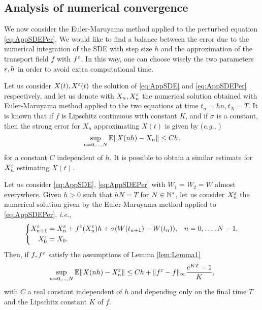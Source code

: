 \subsection{Analysis of numerical convergence}

We now consider the Euler-Maruyama method applied to the perturbed equation \eqref{eq:AppSDEPer}. We would like to find a balance between the error due to the numerical integration of the SDE with step size $h$ and the approximation of the transport field $f$ with $f^\varepsilon$. In this way, one can choose wisely the two parameters $\varepsilon, h$ in order to avoid extra computational time.

\noindent Let us consider $X(t), X^\varepsilon(t)$ the solution of \eqref{eq:AppSDE} and \eqref{eq:AppSDEPer} respectively, and let us denote with $X_n, X_n^\varepsilon$ the numerical solution obtained with Euler-Maruyama method applied to the two equations at time $t_n = hn, t_N = T$. It is known that if $f$ is Lipschitz continuous with constant $K$, and if $\sigma$ is a constant, then the strong error for $X_n$ approximating $X(t)$ is given by (\textit{e.g.}, \cite[Chapter 10]{Kloeden1992})
\begin{equation}\label{eq:StrongEM}
	\sup_{n = 0, \dots, N} \mathbb{E} \|X(nh) - X_n\| \leq C h,
\end{equation}
for a constant $C$ independent of $h$. It is possible to obtain a similar estimate for $X_n^\varepsilon$ estimating $X(t)$. 
\begin{theorem}\label{thm:StrongConv} Let us consider \eqref{eq:AppSDE}, \eqref{eq:AppSDEPer} with $W_1 = W_2 = W$ almost everywhere. Given $h > 0$ such that $hN = T$ for $N \in \mathbb{N}^*$, let us consider $X_n^\varepsilon$ the numerical solution given by the Euler-Maruyama method applied to \eqref{eq:AppSDEPer}, \textit{i.e.},
\begin{equation*}
\left \{
\begin{aligned}
	X^\varepsilon_{n+1} &= X^\varepsilon_n + f^\varepsilon(X^\varepsilon_n)h + \sigma (W(t_{n+1}) - W(t_n)), && n = 0, \dots, N - 1, \\
	X^\varepsilon_0 &= X_0.
\end{aligned} \right .
\end{equation*}
Then, if $f, f^\varepsilon$ satisfy the assumptions of Lemma \ref{lem:Lemma1}
\begin{equation}\label{eq:StrongConvEpl}
	\sup_{n = 0, \dots, N} \mathbb{E} \|X(nh) - X^\varepsilon_n\| \leq C h +  \|f^\varepsilon - f\|_{\infty} \frac{e^{KT} - 1}{K}, 
\end{equation}
with $C$ a real constant independent of $h$ and depending only on the final time $T$ and the Lipschitz constant $K$ of $f$.
\end{theorem}

